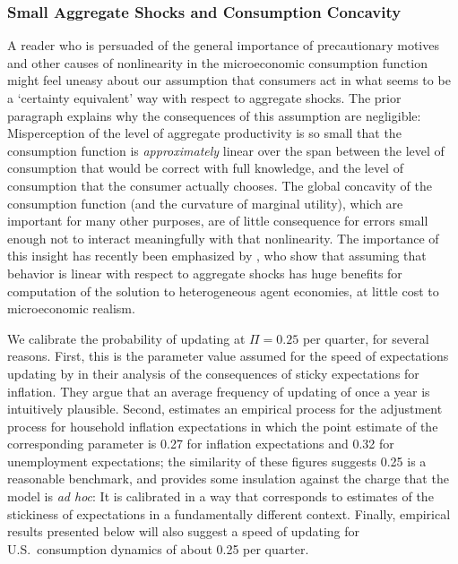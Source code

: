 \documentclass[titlepage]{./econtex}
\begin{document}
\hypertarget{ConcavityAggImp}{}
\subsubsection{Small Aggregate Shocks and Consumption Concavity}
A reader who is persuaded of the general importance of precautionary motives and other causes of nonlinearity in the microeconomic consumption function might feel uneasy about our assumption that consumers act in what seems to be a `certainty equivalent' way with respect to aggregate shocks.  The prior paragraph explains why the consequences of this assumption are negligible: Misperception of the level of aggregate productivity is so small that the consumption function is \textit{approximately} linear over the span between the level of consumption that would be correct with full knowledge, and the level of consumption that the consumer actually chooses.  The global concavity of the consumption function (and the curvature of marginal utility), which are important for many other purposes, are of little consequence for errors small enough not to interact meaningfully with that nonlinearity.  The importance of this insight has recently been emphasized by \cite{bmpMITshocks}, who show that assuming that behavior is linear with respect to aggregate shocks has huge benefits for computation of the solution to heterogeneous agent economies, at little cost to microeconomic realism.

We calibrate the probability of updating at $\Pi= %
0.25 %
 $ per quarter, for several reasons.  First, this is the parameter value assumed for the speed of expectations updating by \cite{mrSlumps} in their analysis of the consequences of sticky expectations for inflation.  They argue that an average frequency of updating of once a year is intuitively plausible.  Second, \cite{carroll:epidemicinflQJE} estimates an empirical process for the adjustment process for household inflation expectations in which the point estimate of the corresponding parameter is 0.27 for inflation expectations and 0.32 for unemployment expectations; the similarity of these figures suggests 0.25 is a reasonable benchmark, and provides some insulation against the charge that the model is {\it ad hoc}: It is calibrated in a way that corresponds to estimates of the stickiness of expectations in a fundamentally different context.  Finally, empirical results presented below will also suggest a speed of updating for U.S.\ consumption dynamics of about 0.25 per quarter.
\end{document}
